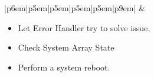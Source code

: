 \documentclass{article}
\begin{document}
\begin{table}[H]
\begin{tabular}{|p{6em}|p{5em}|p{5em}|p{5em}|p{5em}|p{9em}|}
			 & \begin{minipage}[t]{\linewidth}
				   \begin{itemize}[nosep, wide=0pt, leftmargin=*, after=\strut]
					\item Let Error Handler try to solve issue.
					\item Check System Array State
					\item Perform a system reboot.
				\end{itemize}
			   \end{minipage}  \tabularnewline{}
	
		\end{tabular}%
	\caption{\label{tab:Prompt}Prompt Generation FMEA \\\hspace{0.1\textwidth} \textbf{Req:} \hyperref[SR1]{SR1}, \hyperref[SR2]{SR2}, \hyperref[SR3]{SR3}}
	\end{table}
		
\end{document}

